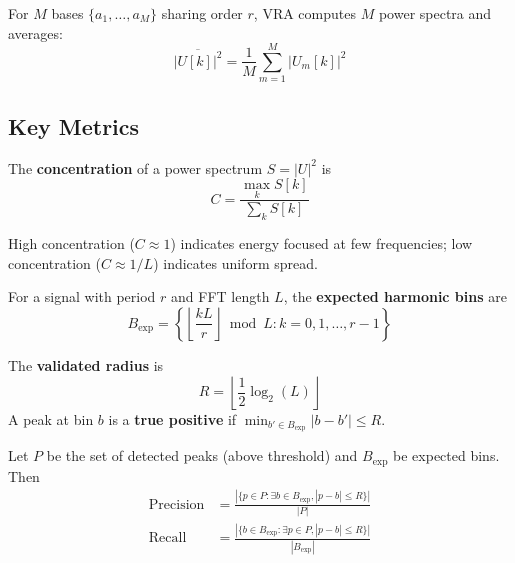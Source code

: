 For $M$ bases $\{a_1, \ldots, a_M\}$ sharing order $r$, VRA computes $M$ power spectra and averages:
\begin{equation}
\overline{|U[k]|^2} = \frac{1}{M} \sum_{m=1}^{M} |U_m[k]|^2
\end{equation}

\subsection{Key Metrics}

\begin{definition}[Concentration]
The \textbf{concentration} of a power spectrum $S = |U|^2$ is
\begin{equation}
C = \frac{\max_k S[k]}{\sum_k S[k]}
\end{equation}
\end{definition}

High concentration ($C \approx 1$) indicates energy focused at few frequencies; low concentration ($C \approx 1/L$) indicates uniform spread.

\begin{definition}
For a signal with period $r$ and FFT length $L$, the \textbf{expected harmonic bins} are
\begin{equation}
B_{\text{exp}} = \left\{ \left\lfloor \frac{kL}{r} \right\rfloor \bmod L : k = 0, 1, \ldots, r-1 \right\}
\end{equation}
\end{definition}

\begin{definition}
The \textbf{validated radius} is
\begin{equation}
R = \left\lfloor \frac{1}{2} \log_2(L) \right\rfloor
\end{equation}
A peak at bin $b$ is a \textbf{true positive} if $\min_{b' \in B_{\text{exp}}} |b - b'| \leq R$.
\end{definition}

\begin{definition}
Let $P$ be the set of detected peaks (above threshold) and $B_{\text{exp}}$ be expected bins. Then
\begin{align}
\text{Precision} &= \frac{|\{p \in P : \exists b \in B_{\text{exp}}, |p-b| \leq R\}|}{|P|} \\
\text{Recall} &= \frac{|\{b \in B_{\text{exp}} : \exists p \in P, |p-b| \leq R\}|}{|B_{\text{exp}}|}
\end{align}
\end{definition}

